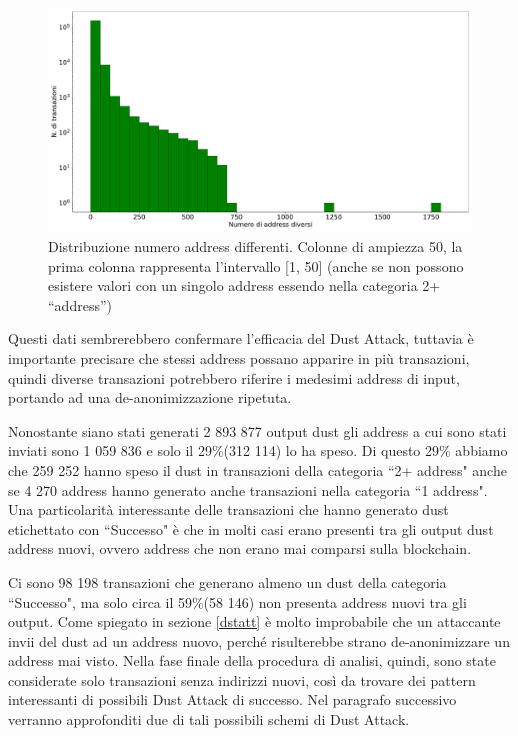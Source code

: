  \begin{figure}[h!]
     \centering
     \includegraphics[scale=0.3]{Grafici/num_addr.pdf}
     \caption{Distribuzione numero address differenti. Colonne di ampiezza 50, la prima colonna rappresenta l'intervallo [1, 50] (anche se non possono esistere valori con un singolo address essendo nella categoria 2+ ``address'')}
     \label{fig:diff_addr}
 \end{figure}
\FloatBarrier
Questi dati sembrerebbero confermare l'efficacia del Dust Attack, tuttavia è importante precisare che stessi address possano apparire in più transazioni, quindi diverse transazioni potrebbero riferire i medesimi address di input, portando ad una de-anonimizzazione ripetuta. 

Nonostante siano stati generati 2 893 877 output dust gli address a cui sono stati inviati sono 1 059 836 e solo il 29\%(312 114) lo ha speso. Di questo 29\% abbiamo che 259 252 hanno speso il dust in transazioni della categoria ``2+ address" anche se 4 270 address hanno generato anche transazioni nella categoria ``1 address". Una particolarità interessante delle transazioni che hanno generato dust etichettato con ``Successo" è che in molti casi erano presenti tra gli output dust address nuovi, ovvero address che non erano mai comparsi sulla blockchain. 

Ci sono 98 198 transazioni che generano almeno un dust della categoria ``Successo", ma solo circa il 59\%(58 146) non presenta address nuovi tra gli output. Come spiegato in sezione \ref{dstatt} è molto improbabile che un attaccante invii del dust ad un address nuovo, perché risulterebbe strano de-anonimizzare un address mai visto. Nella fase finale della procedura di analisi, quindi, sono state considerate solo transazioni senza indirizzi nuovi, così da trovare dei pattern interessanti di possibili Dust Attack di successo. Nel paragrafo successivo verranno approfonditi due di tali possibili schemi di Dust Attack. 

